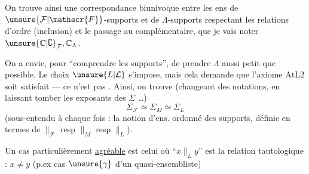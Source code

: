 
On trouve ainsi une correspondance biunivoque entre les ens de $\unsure{\mathcal{F}|\mathscr{F}}$-supports et de $\Lambda$-supports
respectant les relations d'ordre (inclusion) et le passage au complémentaire, que je vais noter $\unsure{\mathbb{C}|\complement}_{\mathcal{F}},\mathbb{C}_\Lambda$.

On a envie, pour ``comprendre les supports'', de prendre $\Lambda$ aussi petit que possible. Le choix $\unsure{L|\mathcal{L}}$ s'impose, mais cela demande que l'axiome $\mathrm{AtL2}$ soit satisfait --- ce n'est pas . Ainsi, on trouve (changeant des notations, en laissant tomber les exposants des $\Sigma$ \dots)
\[
\Sigma_{\mathcal{F}}\simeq\Sigma_M\simeq\Sigma_L
\]
(sous-entendu à chaque fois : la notion d'ens. ordonné des supports, définie en termes de $\parallel_{\mathcal{F}}$ resp $\parallel_M$ resp $\parallel_L$).

Un cas particulièrement \uline{agréable} est celui où ``$x\parallel_L y$'' est la relation tautologique : $x\ne y$ (p.ex cas $\unsure{\gamma}$ d'un  quasi-ensembliste)
